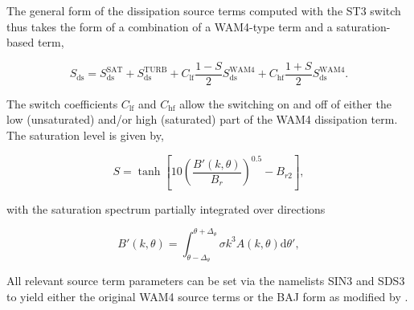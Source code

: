 The general form of the dissipation source terms computed with the ST3 switch
thus takes the form of a combination of a WAM4-type term and a saturation-based
term,

\begin{equation}
 S_{\mathrm{ds}} =S_{\mathrm{ds}}^{\mathrm{SAT}}+S_{\mathrm{ds}}^{\mathrm{TURB}} +
C_{\mathrm{lf}} \frac{1-S}{2} S_{\mathrm{ds}}^{\mathrm{WAM4}}+
C_{\mathrm{hf}} \frac{1+S}{2} S_{\mathrm{ds}}^{\mathrm{WAM4}}.
\end{equation}

\noindent
The switch coefficients $C_{\mathrm{lf}}$ and $C_{\mathrm{hf}}$ allow the
switching on and off of either the low (unsaturated) and/or high (saturated)
part of the WAM4 dissipation term. The saturation level is given by,

\begin{equation}
S=\tanh\left[10
\left(\frac{B'\left(k,\theta\right)}{B_r}\right)^{0.5}-B_{r2}\right] ,
\end{equation}

\noindent
with the saturation spectrum partially integrated over directions

\begin{equation}
B'\left(k,\theta \right)=\int_{\theta-\Delta_\theta}^{\theta+\Delta_\theta}
\sigma k^3 A(k,\theta) \mathrm d \theta' \label{eq:defBofk},
\end{equation}

\noindent
All relevant source term parameters can be set via the namelists SIN3 and SDS3
to yield either the original WAM4 source terms or the BAJ form as modified by
\cite{rep:Bea05}.

